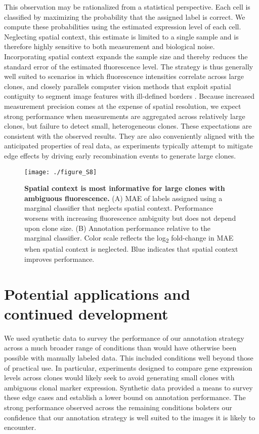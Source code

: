 This observation may be rationalized from a statistical perspective. Each cell is classified by maximizing the probability that the assigned label is correct. We compute these probabilities using the estimated expression level of each cell. Neglecting spatial context, this estimate is limited to a single sample and is therefore highly sensitive to both measurement and biological noise. Incorporating spatial context expands the sample size and thereby reduces the standard error of the estimated fluorescence level. The strategy is thus generally well suited to scenarios in which fluorescence intensities correlate across large clones, and closely parallels computer vision methods that exploit spatial contiguity to segment image features with ill-defined borders \cite{Nguyen2012}. Because increased measurement precision comes at the expense of spatial resolution, we expect strong performance when measurements are aggregated across relatively large clones, but failure to detect small, heterogeneous clones. These expectations are consistent with the observed results. They are also conveniently aligned with the anticipated properties of real data, as experiments typically attempt to mitigate edge effects by driving early recombination events to generate large clones.

\begin{figure}[h]
\texttt{[image: ./figure\_S8]}
\caption[Spatial context is most informative for large and ambiguous clones.]{\textbf{Spatial context is most informative for large clones with ambiguous fluorescence.}
(A) MAE of labels assigned using a marginal classifier that neglects spatial context. Performance worsens with increasing fluorescence ambiguity but does not depend upon clone size. (B) Annotation performance relative to the marginal classifier. Color scale reflects the log\textsubscript{2} fold-change in MAE when spatial context is neglected. Blue indicates that spatial context improves performance.}
\label{fig:clones:figS8}
\end{figure}

\section{Potential applications and continued development}

We used synthetic data to survey the performance of our annotation strategy across a much broader range of conditions than would have otherwise been possible with manually labeled data. This included conditions well beyond those of practical use. In particular, experiments designed to compare gene expression levels across clones would likely seek to avoid generating small clones with ambiguous clonal marker expression. Synthetic data provided a means to survey these edge cases and establish a lower bound on annotation performance. The strong performance observed across the remaining conditions bolsters our confidence that our annotation strategy is well suited to the images it is likely to encounter.

